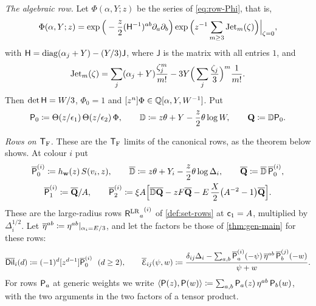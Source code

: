 \emph{The algebraic row.} Let $\Phi(\alpha,Y;z)$ be the series of \eqref{eq:row-Phi}, that is,
\[
\Phi(\alpha,Y;z)=\exp\Big(-\frac{z}{2}(\mathsf{H}^{-1})^{ab}\partial_a\partial_b\Big)\exp\Big(z^{-1}\sum_{m\geq 3}\mathrm{Jet}_m(\zeta)\Big)\Big|_{\zeta=0},
\]
with $\mathsf{H}=\mathrm{diag}(\alpha_j+Y)-(Y/3)\mathsf{J}$, where $\mathsf{J}$ is the matrix with all entries $1$, and
\[
\mathrm{Jet}_m(\zeta)=\sum_j(\alpha_j+Y)\frac{\zeta_j^m}{m!}-3Y\Big(\sum_j\frac{\zeta_j}{3}\Big)^{m}\frac{1}{m!}.
\]
Then $\det\mathsf{H}=W/3$, $\Phi_0=1$ and $[z^n]\Phi\in\mathbb{Q}[\alpha,Y,W^{-1}]$. Put
\[
\mathsf{P}_0\coloneqq\Theta(z/\epsilon_1)\,\Theta(z/\epsilon_2)\,\Phi,\qquad
\mathbb{D}\coloneqq z\theta+Y-\frac{z}{2}\theta\log W,\qquad
\mathbf{Q}\coloneqq\mathbb{D}\mathsf{P}_0.
\]

\emph{Rows on $\mathsf{T}_{\mathrm{F}}$.} These are the $\mathsf{T}_{\mathrm{F}}$ limits of the canonical rows, as the theorem below shows. At colour $i$ put
\begin{gather*}
\overline{\mathsf{P}}_0^{(i)}\coloneqq h_{\mathbf{w}}(z)\,S(v_i,z),\qquad
\overline{\mathbb{D}}\coloneqq z\theta+Y_i-\frac{z}{2}\theta\log\Delta_i,\qquad
\overline{\mathbf{Q}}\coloneqq\overline{\mathbb{D}}\,\overline{\mathsf{P}}_0^{(i)},\\
\overline{\mathsf{P}}_1^{(i)}\coloneqq\overline{\mathbf{Q}}/A,\qquad
\overline{\mathsf{P}}_2^{(i)}\coloneqq\xi A\Big[\overline{\mathbb{D}}\overline{\mathbf{Q}}-zF\overline{\mathbf{Q}}-E\,\frac{X}{2}\big(A^{-2}-1\big)\overline{\mathbf{Q}}\Big].
\end{gather*}
These are the large-radius rows ${{\mathsf{R}^{\mathrm{LR}}}_a}^{(i)}$ of \cref{def:set-rows} at $\mathsf{c}_{1}=A$, multiplied by $\Delta_i^{1/2}$. Let $\overline{\eta}^{ab}\coloneqq\eta^{ab}|_{\alpha_i=E/3}$, and let the factors be those of \cref{thm:gen-main} for these rows:
\[
\Dilb_i(d)\coloneqq(-1)^d[z^{d-1}]\Pb_0^{(i)}\ \ (d\geq2),\qquad
\Edgeb_{ij}(\psi,w)\coloneqq\frac{\delta_{ij}\Delta_i-\sum_{a,b}\Pb_a^{(i)}(-\psi)\,\speEtab^{ab}\,\Pb_b^{(j)}(-w)}{\psi+w}.
\]
For rows $\mathsf{P}_a$ at generic weights we write $\langle\mathsf{P}(z),\mathsf{P}(w)\rangle\coloneqq\sum_{a,b}\mathsf{P}_a(z)\,\eta^{ab}\,\mathsf{P}_b(w)$, with the two arguments in the two factors of a tensor product.

